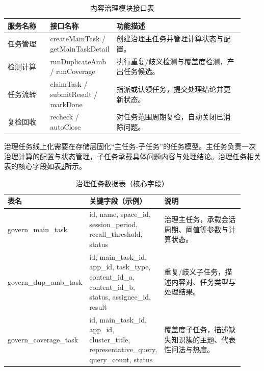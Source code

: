 \begin{table}[!htbp]
  \centering
  \caption{内容治理模块接口表}
  \label{tab:cg_api}
  \small
  \begin{tabular}{>{\raggedright\arraybackslash}p{0.18\linewidth}|>{\raggedright\arraybackslash}p{0.20\linewidth}|>{\raggedright\arraybackslash}p{0.54\linewidth}}
    \hline
    服务名称 & 接口名称 & 功能描述 \\ \hline
    任务管理 & createMainTask / getMainTaskDetail & 创建治理主任务并管理计算状态与配置。 \\ \hline
    检测计算 & runDuplicateAmb / runCoverage & 执行重复/歧义检测与覆盖度检测，产出任务候选。 \\ \hline
    任务流转 & claimTask / submitResult / markDone & 指派或认领任务，提交处理结论并更新状态。 \\ \hline
    复检回收 & recheck / autoClose & 对任务范围周期复检，自动关闭已消除问题。 \\ \hline
  \end{tabular}
\end{table}

治理任务线上化需要在存储层固化“主任务-子任务”的任务模型。主任务负责一次治理计算的配置与状态管理，子任务承载具体问题内容与处理结论。治理任务相关表的核心字段如表\ref{tab:cg_tables}所示。

\begin{table}[!htbp]
  \centering
  \caption{治理任务数据表（核心字段）}
  \label{tab:cg_tables}
  \small
  \begin{tabular}{>{\raggedright\arraybackslash}p{0.18\linewidth}|>{\raggedright\arraybackslash}p{0.26\linewidth}|>{\raggedright\arraybackslash}p{0.48\linewidth}}
    \hline
    表名 & 关键字段（示例） & 说明 \\ \hline
    govern\_\allowbreak main\_\allowbreak task & id, name, space\_\allowbreak id, session\_\allowbreak period, recall\_\allowbreak threshold, status & 治理主任务，承载会话周期、阈值等参数与计算状态。 \\ \hline
    govern\_\allowbreak dup\_\allowbreak amb\_\allowbreak task & id, main\_\allowbreak task\_\allowbreak id, app\_\allowbreak id, task\_\allowbreak type, content\_\allowbreak id\_\allowbreak a, content\_\allowbreak id\_\allowbreak b, status, assignee\_\allowbreak id, result & 重复/歧义子任务，描述内容对、任务类型与处理结果。 \\ \hline
    govern\_\allowbreak coverage\_\allowbreak task & id, main\_\allowbreak task\_\allowbreak id, app\_\allowbreak id, cluster\_\allowbreak title, representative\_\allowbreak query, query\_\allowbreak count, status & 覆盖度子任务，描述缺失知识簇的主题、代表性问法与热度。 \\ \hline
  \end{tabular}
\end{table}

